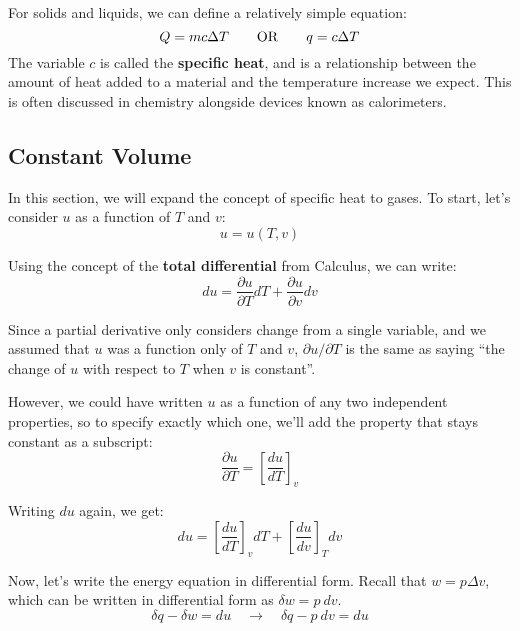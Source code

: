 For solids and liquids, we can define a relatively simple equation:
\begin{equation} \label{eq:calorimetry}
  Q = mc\Delta T\quad\quad {\rm OR} \quad\quad q=c\Delta T
\end{equation}
The variable $c$ is called the {\bf specific heat}, and is a relationship between the amount of heat added to a material and the temperature increase we expect.  This is often discussed in chemistry alongside devices known as calorimeters.

\subsection{Constant Volume}
In this section, we will expand the concept of specific heat to gases.  To start, let's consider $u$ as a function of $T$ and $v$:
\begin{equation*}
  u = u(T, v)
\end{equation*}

Using the concept of the {\bf total differential} from Calculus, we can write:
\begin{equation*}
  du = \frac{\partial u}{\partial T}dT + \frac{\partial u}{\partial v}dv
\end{equation*}

Since a partial derivative only considers change from a single variable, and we assumed that $u$ was a function only of $T$ and $v$, $\partial u / \partial T$ is the same as saying ``the change of $u$ with respect to $T$ when $v$ is constant''.

However, we could have written $u$ as a function of any two independent properties, so to specify exactly which one, we'll add the property that stays constant as a subscript:
\begin{equation*}
  \frac{\partial u}{\partial T} = \left[\frac{d u}{d T}\right]_v
\end{equation*}

Writing $du$ again, we get:
\begin{equation}\label{eq:du_Tv}
  du = \left[\frac{d u}{d T}\right]_v dT + \left[\frac{d u}{d v}\right]_T dv
\end{equation}

Now, let's write the energy equation in differential form.  Recall that $w = p \Delta v$, which can be written in differential form as $\delta w = p\: dv$.
\begin{equation}\label{eq:differentialEnergy}
  \delta q - \delta w = du \quad \rightarrow \quad \delta q - p\: dv = du
\end{equation}

